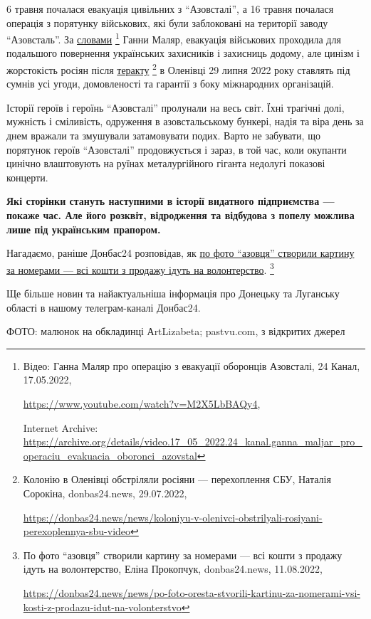 6 травня почалася евакуація цивільних з \enquote{Азовсталі}, а 16 травня почалася
операція з порятунку військових, які були заблоковані на території заводу
\enquote{Азовсталь}. За \href{https://archive.org/details/video.17_05_2022.24_kanal.ganna_maljar_pro_operaciu_evakuacia_oboronci_azovstal}{словами}%
\footnote{Відео: Ганна Маляр про операцію з евакуації оборонців Азовсталі, 24 Канал, 17.05.2022, %
\par\url{https://www.youtube.com/watch?v=M2X5LbBAQy4}, \par%
Internet Archive: \url{https://archive.org/details/video.17_05_2022.24_kanal.ganna_maljar_pro_operaciu_evakuacia_oboronci_azovstal}%
} Ганни Маляр, евакуація військових проходила для
подальшого повернення українських захисників і захисниць додому, але цинізм і
жорстокість росіян після \href{https://donbas24.news/news/koloniyu-v-olenivci-obstrilyali-rosiyani-perexoplennya-sbu-video}{теракту}%
\footnote{Колонію в Оленівці обстріляли росіяни — перехоплення СБУ, Наталія Сорокіна, donbas24.news, 29.07.2022, %
\par\url{https://donbas24.news/news/koloniyu-v-olenivci-obstrilyali-rosiyani-perexoplennya-sbu-video}
} в Оленівці 29 липня 2022 року ставлять під
сумнів усі угоди, домовленості та гарантії з боку міжнародних організацій.

Історії героїв і героїнь \enquote{Азовсталі} пролунали на весь світ. Їхні трагічні
долі, мужність і сміливість, одруження в азовстальському бункері, надія та віра
день за днем вражали та змушували затамовувати подих. Варто не забувати, що
порятунок героїв \enquote{Азовсталі} продовжується і зараз, в той час, коли окупанти
цинічно влаштовують на руїнах металургійного гіганта недолугі показові
концерти.

\textbf{Які сторінки стануть наступними в історії видатного підприємства — покаже час.
Але його розквіт, відродження та відбудова з попелу можлива лише під
українським прапором.}

Нагадаємо, раніше Донбас24 розповідав, як \href{https://donbas24.news/news/po-foto-oresta-stvorili-kartinu-za-nomerami-vsi-kosti-z-prodazu-idut-na-volonterstvo}{по фото \enquote{азовця} створили картину за
номерами — всі кошти з продажу ідуть на волонтерство}.%
\footnote{По фото \enquote{азовця} створили картину за номерами — всі кошти з продажу ідуть на волонтерство, Еліна Прокопчук, donbas24.news, 11.08.2022, \par\url{https://donbas24.news/news/po-foto-oresta-stvorili-kartinu-za-nomerami-vsi-kosti-z-prodazu-idut-na-volonterstvo}
}

Ще більше новин та найактуальніша інформація про Донецьку та Луганську області
в нашому телеграм-каналі Донбас24.

ФОТО: малюнок на обкладинці АrtLizabeta; pastvu.com, з відкритих джерел


